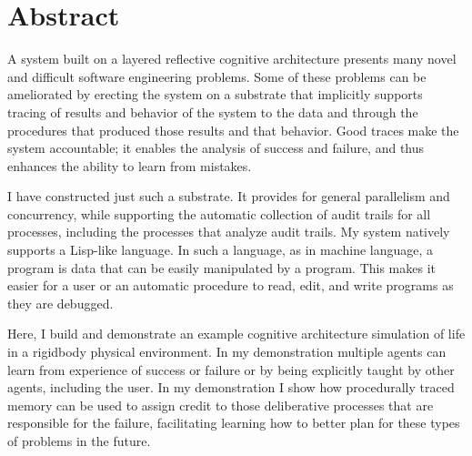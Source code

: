 \begingroup
\let\clearpage\relax
\let\cleardoublepage\relax
\let\cleardoublepage\relax

\chapter*{Abstract}

A system built on a layered reflective cognitive architecture presents
many novel and difficult software engineering problems.  Some of these
problems can be ameliorated by erecting the system on a substrate that
implicitly supports tracing of results and behavior of the system to
the data and through the procedures that produced those results and
that behavior.  Good traces make the system accountable; it enables
the analysis of success and failure, and thus enhances the ability to
learn from mistakes.

I have constructed just such a substrate.  It provides for general
parallelism and concurrency, while supporting the automatic collection
of audit trails for all processes, including the processes that
analyze audit trails.  My system natively supports a Lisp-like
language.  In such a language, as in machine language, a program is
data that can be easily manipulated by a program.  This makes it
easier for a user or an automatic procedure to read, edit, and write
programs as they are debugged.

Here, I build and demonstrate an example cognitive architecture
simulation of life in a rigidbody physical environment.  In my
demonstration multiple agents can learn from experience of success or
failure or by being explicitly taught by other agents, including the
user.  In my demonstration I show how procedurally traced memory can
be used to assign credit to those deliberative processes that are
responsible for the failure, facilitating learning how to better plan
for these types of problems in the future.

\endgroup

\vfill

